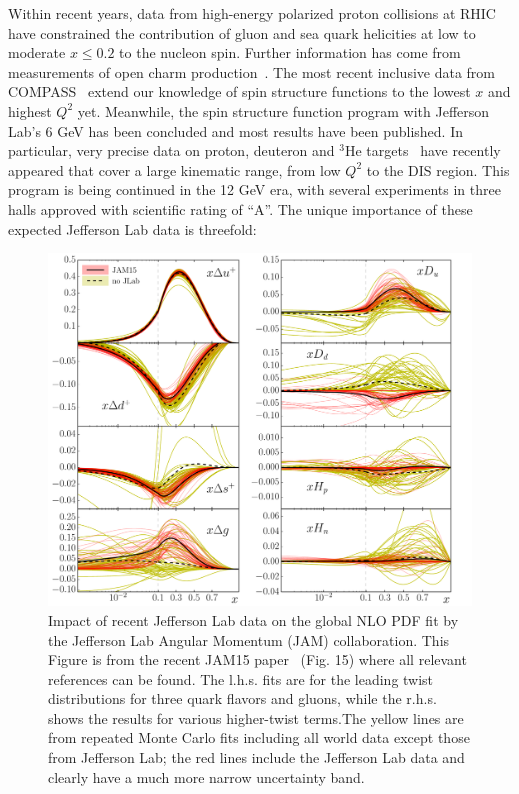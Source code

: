 Within recent years, data from high-energy polarized proton collisions at 
RHIC~\cite{STAR_jet15,PHENIX_pi14,PHENIX_pi15,STAR_W14,PHENIX_W15} 
have constrained the contribution of gluon
and sea quark helicities at low to moderate $x \le 0.2$ to the nucleon spin. Further information has come from measurements
of open charm production~\cite{COMPASS_g13}. The most recent 
inclusive data from COMPASS~\cite{COMPASS16} extend our knowledge of spin structure functions to the lowest
$x$ and highest $Q^2$ yet. 
Meanwhile, the spin structure function program with Jefferson Lab's 6 GeV has been concluded and most results have been 
published. In particular, very precise data on proton, deuteron and $^3$He 
targets~\cite{eg1b-d,eg1b-p,eg1-dvcs,E06-014_A1,E06-014_d2,E01-012}
 have recently appeared 
that cover a large kinematic range, from low $Q^2$ to the DIS region. This program is being continued in the 12 GeV era, with several
experiments in three halls approved with scientific rating of ``A''. The unique importance of these expected Jefferson Lab 
data is threefold:

\begin{figure}[htb!]
\begin{center}
\includegraphics[width=6in]{dis/IMPACT_JLAB.pdf}
\end{center}
\caption{\baselineskip 13pt \small
Impact of recent Jefferson Lab data on the global NLO PDF fit by the Jefferson Lab Angular Momentum (JAM) collaboration. 
This Figure is from the recent JAM15 paper~\cite{JAM15}
(Fig. 15) where all relevant references  can be found. The l.h.s. fits are for the leading twist distributions for three quark flavors
and gluons, while the r.h.s. shows the results for various higher-twist terms.The yellow lines are from repeated
Monte Carlo fits including all world data except those from Jefferson Lab; the red lines include the Jefferson Lab data and
clearly have a much more narrow uncertainty band.}
\label{JLabImpact}
\end{figure}

